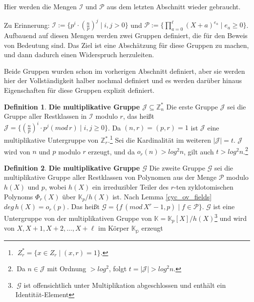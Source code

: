 \documentclass[12pt,oneside]{article}
\theoremstyle{remark}
\theoremstyle{definition}
\newtheorem{definition}{Definition}[section]
\begin{document}
Hier werden die Mengen $\mathcal{I}$ und $\mathcal{P}$ aus dem letzten Abschnitt wieder gebraucht.\newline

Zu Erinnerung: $\mathcal{I} := \{ p^{i} \cdot (\frac{n}{p})^j \mid i,j > 0 \}$ und $\mathcal{P} := \{ \prod_{a = 0}^{\ell} (X + a)^{e_{a}} \mid e_{a} \geq 0 \}$.
Aufbauend auf diesen Mengen werden zwei Gruppen definiert, die für den Beweis von Bedeutung sind. Das Ziel ist eine Abschätzung für diese Gruppen zu machen, und dann dadurch einen Widerspruch herzuleiten.\newline\newline

Beide Gruppen wurden schon im vorherigen Abschnitt definiert, aber sie werden hier der Vollständigkeit halber nochmal definiert und es werden darüber hinaus Eigenschaften für diese Gruppen explizit definiert.

\newpage
\begin{definition}\label{first_group}
\textbf{Die multiplikative Gruppe $\mathcal{J} \subseteq \mathbb{Z}_{n}^{*}$}\newline
Die erste Gruppe $\mathcal{J}$ sei die Gruppe aller Restklassen in $\mathcal{I}$ modulo $r$, das heißt $\mathcal{J} = \{(\frac{n}{p})^i \cdot p^j ( mod \, r) \mid i,j \geq 0 \}$. Da $(n,r) = (p,r) = 1 $ ist $\mathcal{J}$ eine multiplikative Untergruppe von $\mathbb{Z}_{r}^{*}$.\footnote{$\; {Z}_{r}^{*} = \{ x \in Z_{r} \mid (x,r) =1 \}$.} Sei die Kardinalität im weiteren $ | \mathcal{J} | = t $. $\mathcal{J}$ wird von $n$ und $p$ modulo $r$ erzeugt, und da $o_{r}(n) > log^2 n$, gilt auch $t > log^2 n$.\footnote{$ \,$Da $n \in \mathcal{J}$ mit Ordnung $> log^2 $, folgt $t = |\mathcal{J}| > log^2n$.}\newline
\end{definition}


\begin{definition}\label{second-group}
\textbf{Die multiplikative Gruppe $\mathcal{G}$}\newline
Die zweite Gruppe  $\mathcal{G}$ sei die multiplikative Gruppe aller Restklassen von Polynomen aus der Menge $\mathcal{P}$ modulo $h(X)$ und $p$, wobei $h(X)$ ein irreduzibler Teiler des $r$-ten zyklotomischen Polynoms $\Phi_{r}(X)$ über $\mathbb{K}_{p}/h(X)$ ist. Nach Lemma \ref{cyc_ov_fields} $deg \, h(X) = o_{r}(p)$. Das heißt $\mathcal{G} = \{ f \, (mod \, X^r - 1,p) \mid f \in \mathcal{P}\}$. $\mathcal{G}$ ist eine Untergruppe von der multiplikativen Gruppe von  $\mathbb{K} = \mathbb{K}_p[X] / h(X)$\footnote{$ \, \mathcal{G}$ ist offensichtlich unter Multiplikation abgeschlossen und enthält ein Identität-Element} und wird von $X,X+1,X+2, ..., X + \ell $ im Körper $\mathbb{K_{p}}$ erzeugt
\end{definition}
\end{document}
